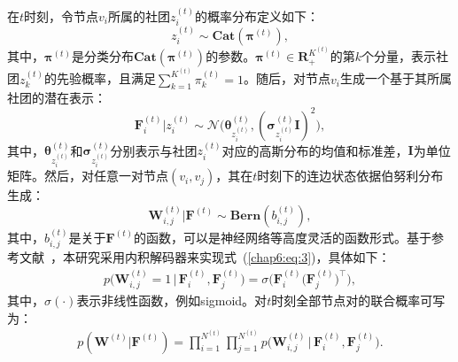 在$t$时刻，令节点$v_i$所属的社团$z_i^{(t)}$的概率分布定义如下：
\begin{equation}
z_i^{(t)} \sim \bm{Cat}(\bm{\pi}^{(t)}),
\label{eq:1}
\end{equation}
其中，$\bm{\pi}^{(t)}$是分类分布$\bm{Cat}(\bm{\pi}^{(t)})$的参数。$\bm{\pi}^{(t)} \in \boldsymbol{R}_{+}^{K^{(t)}}$的第$k$个分量，表示社团$z_k^{(t)}$的先验概率，且满足$\sum\nolimits_{k=1}^{K^{(t)}}{\pi_{k}^{(t)}}=1$。随后，对节点$v_i$生成一个基于其所属社团的潜在表示：
\begin{equation}
\mathbf{F}_i^{(t)} \Big| z_i^{(t)} \sim \bm{\mathcal{N}} \big(\bm{\theta}_{z_i^{(t)}}^{(t)}, (\bm{\sigma}_{z_i^{(t)}}^{(t)}\mathbf{I})^{2}\big),
\label{eq:2}
\end{equation}
其中，$\bm{\theta}_{z_i^{(t)}}^{(t)}$和$\bm{\sigma}_{z_i^{(t)}}^{(t)}$分别表示与社团$z_i^{(t)}$对应的高斯分布的均值和标准差，$\mathbf{I}$为单位矩阵。然后，对任意一对节点$(v_i,v_j)$，其在$t$时刻下的连边状态依据伯努利分布生成：
\begin{equation}
    \mathbf{W}^{(t)}_{i,j} \Big| \mathbf{F}^{(t)} \sim \bm{Bern}(b_{i,j}^{(t)}),
\label{chap6:eq:3}
\end{equation}
其中，$b_{i,j}^{(t)}$是关于$\mathbf{F}^{(t)}$的函数，可以是神经网络等高度灵活的函数形式。基于参考文献~\cite{kipf2016variational}，本研究采用内积解码器来实现式~(\ref{chap6:eq:3})，具体如下：
\begin{align}
        p\big(\mathbf{W}^{(t)}_{i,j} =1 \,\big|\, \mathbf{F}_{i}^{(t)}, \mathbf{F}_{j}^{(t)}\big) 
        =  \sigma\Big(\mathbf{F}_{i}^{(t)}\big(\mathbf{F}_{j}^{(t)}\big)^{\top}\Big),
\label{eq:4}
\end{align}
其中，$\sigma(\cdot)$表示非线性函数，例如sigmoid。对$t$时刻全部节点对的联合概率可写为：
\begin{align}
        p(\mathbf{W}^{(t)} \big| \mathbf{F}^{(t)})  
        = \prod \limits_{i=1}^{N^{(t)}} \prod \limits_{j=1}^{N^{(t)}} p\big(\mathbf{W}_{i,j}^{(t)} \,\big|\, \mathbf{F}_{i}^{(t)}, \mathbf{F}_{j}^{(t)}\big).
\label{eq:5}
\end{align}

